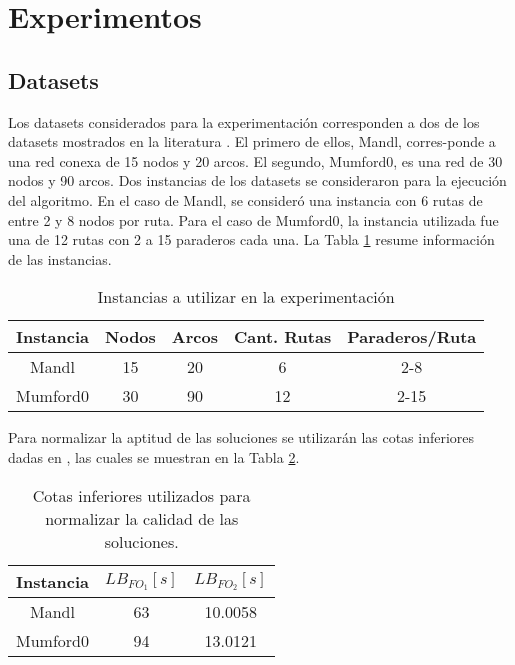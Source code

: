 \section{Experimentos}

\subsection{Datasets}

Los datasets considerados para la experimentación corresponden a dos de los datasets mostrados en la literatura \cite{john2014improved,NewHaEOps}. El primero de ellos, Mandl, corres-ponde a una red conexa de 15 nodos y 20 arcos. El segundo, Mumford0, es una red de 30 nodos y 90 arcos.  Dos instancias de los datasets se consideraron para la ejecución del algoritmo. En el caso de Mandl, se consideró una instancia con 6 rutas de entre 2 y 8 nodos por ruta. Para el caso de Mumford0, la instancia utilizada fue una de 12 rutas con 2 a 15 paraderos cada una. La Tabla \ref{tab:instancias} resume información de las instancias. 

\begin{table}[!htb]
\begin{center}
\begin{tabular}{|c|c|c|c|c|}
\hline
Instancia & Nodos & Arcos & Cant. Rutas & Paraderos/Ruta \\
\hline
\hline
Mandl & 15 & 20 & 6 & 2-8 \\
Mumford0 & 30 & 90 & 12 & 2-15\\
\hline
\end{tabular}
\end{center}
\caption{Instancias a utilizar en la experimentación}
\label{tab:instancias}
\end{table}

Para normalizar la aptitud de las soluciones se utilizarán las cotas inferiores dadas en \cite{NewHaEOps}, las cuales se muestran en la Tabla \ref{tab:norm}.

\begin{table}[!htb]
\begin{center}
\begin{tabular}{|c|c|c|}
\hline
Instancia & $LB_{FO_1} [s]$ & $LB_{FO_2} [s]$\\
\hline
\hline
Mandl & 63 & 10.0058\\
Mumford0 & 94 & 13.0121\\
\hline
\end{tabular}
\end{center}
\caption{Cotas inferiores utilizados para normalizar la calidad de las soluciones.}
\label{tab:norm}
\end{table}

